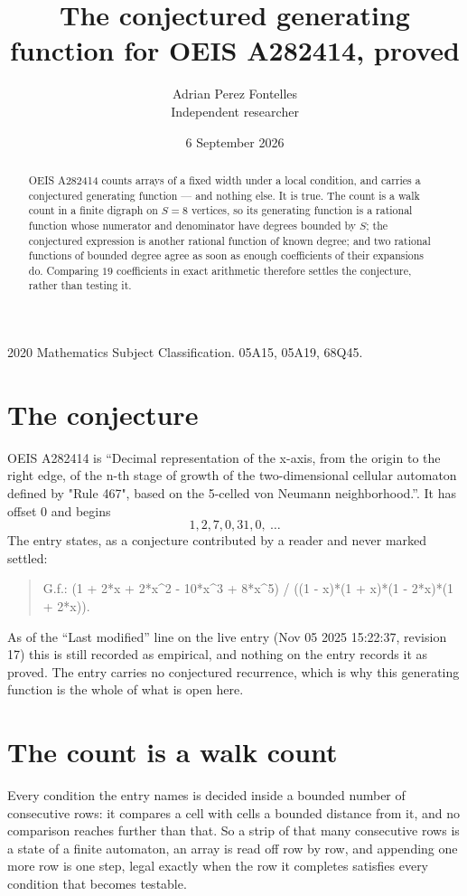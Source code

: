 \documentclass[11pt,a4paper]{article}
\title{The conjectured generating function for OEIS A282414, proved}
\author{Adrian Perez Fontelles\\ \small Independent researcher}
\date{6 September 2026}
\theoremstyle{plain}
\theoremstyle{definition}
\begin{document}
\maketitle

\begin{abstract}
OEIS A282414 counts arrays of a fixed width under a local condition, and carries a conjectured
generating function --- and nothing else. It is true. The count is a walk count in a finite
digraph on $S=8$ vertices, so its generating function is a rational function whose numerator
and denominator have degrees bounded by $S$; the conjectured expression is another rational
function of known degree; and two rational functions of bounded degree agree as soon as enough
coefficients of their expansions do. Comparing $19$ coefficients in exact arithmetic
therefore settles the conjecture, rather than testing it.
\end{abstract}

\noindent\small 2020 Mathematics Subject Classification. 05A15, 05A19, 68Q45.\normalsize

\section{The conjecture}

OEIS A282414 is ``Decimal representation of the x-axis, from the origin to the right edge, of the n-th stage of growth of the two-dimensional cellular automaton defined by "Rule 467", based on the 5-celled von Neumann neighborhood.''. It has offset $0$ and begins
\[
1, 2, 7, 0, 31, 0,\ \dots
\]
The entry states, as a conjecture contributed by a reader and never marked settled:
\begin{quote}
G.f.: (1 + 2*x + 2*x\^{}2 - 10*x\^{}3 + 8*x\^{}5) / ((1 - x)*(1 + x)*(1 - 2*x)*(1 + 2*x)).
\end{quote}
As of the ``Last modified'' line on the live entry (Nov 05 2025 15:22:37, revision 17) this is still
recorded as empirical, and nothing on the entry records it as proved. The entry carries no
conjectured recurrence, which is why this generating function is the whole of what is open
here.

\section{The count is a walk count}

Every condition the entry names is decided inside a bounded number of consecutive rows: it
compares a cell with cells a bounded distance from it, and no comparison reaches further than
that. So a strip of that many consecutive rows is a state of a finite automaton, an array is
read off row by row, and appending one more row is one step, legal exactly when the row it
completes satisfies every condition that becomes testable.
\end{document}
